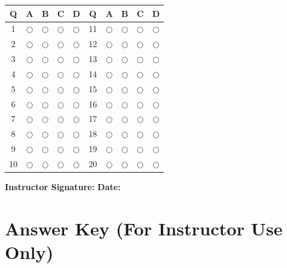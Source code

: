 \documentclass[11pt]{article}
\begin{document}
\begin{center}
\renewcommand{\arraystretch}{2}
\begin{tabular}{|c|c|c|c|c||c|c|c|c|c|}
\hline
\textbf{Q} & \textbf{A} & \textbf{B} & \textbf{C} & \textbf{D} & \textbf{Q} & \textbf{A} & \textbf{B} & \textbf{C} & \textbf{D} \\
\hline
1 & $\bigcirc$ & $\bigcirc$ & $\bigcirc$ & $\bigcirc$ & 11 & $\bigcirc$ & $\bigcirc$ & $\bigcirc$ & $\bigcirc$ \\
\hline
2 & $\bigcirc$ & $\bigcirc$ & $\bigcirc$ & $\bigcirc$ & 12 & $\bigcirc$ & $\bigcirc$ & $\bigcirc$ & $\bigcirc$ \\
\hline
3 & $\bigcirc$ & $\bigcirc$ & $\bigcirc$ & $\bigcirc$ & 13 & $\bigcirc$ & $\bigcirc$ & $\bigcirc$ & $\bigcirc$ \\
\hline
4 & $\bigcirc$ & $\bigcirc$ & $\bigcirc$ & $\bigcirc$ & 14 & $\bigcirc$ & $\bigcirc$ & $\bigcirc$ & $\bigcirc$ \\
\hline
5 & $\bigcirc$ & $\bigcirc$ & $\bigcirc$ & $\bigcirc$ & 15 & $\bigcirc$ & $\bigcirc$ & $\bigcirc$ & $\bigcirc$ \\
\hline
6 & $\bigcirc$ & $\bigcirc$ & $\bigcirc$ & $\bigcirc$ & 16 & $\bigcirc$ & $\bigcirc$ & $\bigcirc$ & $\bigcirc$ \\
\hline
7 & $\bigcirc$ & $\bigcirc$ & $\bigcirc$ & $\bigcirc$ & 17 & $\bigcirc$ & $\bigcirc$ & $\bigcirc$ & $\bigcirc$ \\
\hline
8 & $\bigcirc$ & $\bigcirc$ & $\bigcirc$ & $\bigcirc$ & 18 & $\bigcirc$ & $\bigcirc$ & $\bigcirc$ & $\bigcirc$ \\
\hline
9 & $\bigcirc$ & $\bigcirc$ & $\bigcirc$ & $\bigcirc$ & 19 & $\bigcirc$ & $\bigcirc$ & $\bigcirc$ & $\bigcirc$ \\
\hline
10 & $\bigcirc$ & $\bigcirc$ & $\bigcirc$ & $\bigcirc$ & 20 & $\bigcirc$ & $\bigcirc$ & $\bigcirc$ & $\bigcirc$ \\
\hline
\end{tabular}
\end{center}

\vspace{2cm}

\noindent\textbf{Instructor Signature:} \underline{\hspace{6cm}} \hfill \textbf{Date:} \underline{\hspace{4cm}}

\newpage
\section*{Answer Key (For Instructor Use Only)}
\end{document}
